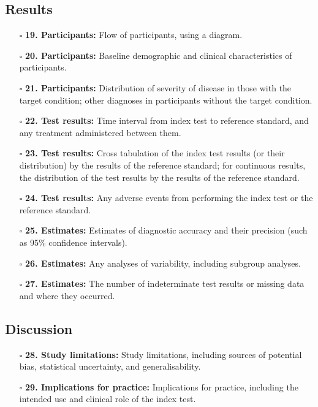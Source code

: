 \documentclass[11pt]{article}
\def\tightlist{}
\begin{document}
\begin{Form}
\subsection{Results}\label{results}

\begin{itemize}
\tightlist
\item[$\square$]
  \textbf{19. Participants:} Flow of participants, using a diagram.
\item[$\square$]
  \textbf{20. Participants:} Baseline demographic and clinical
  characteristics of participants.
\item[$\square$]
  \textbf{21. Participants:} Distribution of severity of disease in
  those with the target condition; other diagnoses in participants
  without the target condition.
\item[$\square$]
  \textbf{22. Test results:} Time interval from index test to reference
  standard, and any treatment administered between them.
\item[$\square$]
  \textbf{23. Test results:} Cross tabulation of the index test results
  (or their distribution) by the results of the reference standard; for
  continuous results, the distribution of the test results by the
  results of the reference standard.
\item[$\square$]
  \textbf{24. Test results:} Any adverse events from performing the
  index test or the reference standard.
\item[$\square$]
  \textbf{25. Estimates:} Estimates of diagnostic accuracy and their
  precision (such as 95\% confidence intervals).
\item[$\square$]
  \textbf{26. Estimates:} Any analyses of variability, including
  subgroup analyses.
\item[$\square$]
  \textbf{27. Estimates:} The number of indeterminate test results or
  missing data and where they occurred.
\end{itemize}

\subsection{Discussion}\label{discussion}

\begin{itemize}
\tightlist
\item[$\square$]
  \textbf{28. Study limitations:} Study limitations, including sources
  of potential bias, statistical uncertainty, and generalisability.
\item[$\square$]
  \textbf{29. Implications for practice:} Implications for practice,
  including the intended use and clinical role of the index test.
\end{itemize}


\end{Form}
\end{document}
